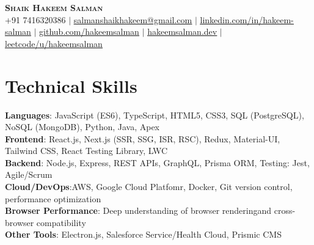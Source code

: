 \documentclass[letterpaper,11pt]{article}
\begin{document}

\begin{center}
    \textbf{\Huge \scshape Shaik Hakeem Salman} \\ \vspace{1pt}
    \small +91 7416320386 $|$ \href{mailto:salmanshaikhakeem@gmai.com}{\underline{salmanshaikhakeem@gmail.com}} $|$ 
    \href{https://linkedin.com/in/hakeem-salman}{\underline{linkedin.com/in/hakeem-salman}} $|$
    \href{https://github.com/hakeemsalman}{\underline{github.com/hakeemsalman}}
    $|$ \href{https://hakeemsalman.dev}{\underline{hakeemsalman.dev}}
    $|$ \href{https://leetcode.com/u/hakeemsalman/}{\underline{leetcode/u/hakeemsalman}}
\end{center}


\section{Technical Skills}
\begin{itemize}[leftmargin=0.15in, label={}]
\small{\item{
\textbf{Languages}: JavaScript (ES6), TypeScript, HTML5, CSS3, SQL (PostgreSQL), NoSQL (MongoDB), Python, Java, Apex \\
\textbf{Frontend}: React.js, Next.js (SSR, SSG, ISR, RSC), Redux, Material-UI, Tailwind CSS, React Testing Library, LWC \\
\textbf{Backend}: Node.js, Express, REST APIs, GraphQL, Prisma ORM, {Testing}: Jest, Agile/Scrum\\
\textbf{Cloud/DevOps}:AWS, Google Cloud Platfomr, Docker, Git version control, performance optimization \\
\textbf{Browser Performance}: Deep understanding of browser renderingand cross-browser compatibility
 \\

\textbf{Other Tools}: Electron.js, Salesforce Service/Health Cloud, Prismic CMS
}}
\end{itemize}

\end{document}
